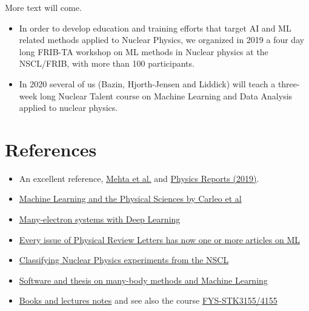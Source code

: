 \documentclass[%
oneside,                 %
final,                   %
10pt]{article}
\begin{document}
More text will come.

\begin{itemize}
\item In order to develop education and training efforts that target AI and ML related methods applied to Nuclear Physics, we  organized in 2019 a four day long  FRIB-TA workshop on ML methods in Nuclear physics at the NSCL/FRIB, with more than 100 participants.

\item In 2020 several of us (Bazin, Hjorth-Jensen and Liddick) will teach a three-week long Nuclear Talent course on Machine Learning and Data Analysis applied to nuclear physics. 
\end{itemize}


\section{References}


\begin{itemize}
\item An excellent reference, \href{{https://arxiv.org/abs/1803.08823}}{Mehta et al.} and \href{{https://www.sciencedirect.com/science/article/pii/S0370157319300766?via%3Dihub}}{Physics Reports (2019)}.

\item \href{{https://arxiv.org/abs/1903.10563}}{Machine Learning and the Physical Sciences by Carleo et al}

\item \href{{https://arxiv.org/pdf/1909.02487.pdf}}{Many-electron systems with Deep Learning}

\item \href{{https://journals.aps.org/prl/abstract/10.1103/PhysRevLett.120.156001}}{Every issue of Physical Review Letters has now one or more articles on ML}

\item \href{{https://github.com/copperwire/thesis/blob/master/main.pdf}}{Classifying Nuclear Physics  experiments from the NSCL}

\item \href{{https://github.com/bsamseth/qflow}}{Software and thesis on many-body methods and Machine Learning}

\item \href{{https://github.com/CompPhysics/MachineLearning}}{Books and lectures notes} and see also the course \href{{https://www.uio.no/studier/emner/matnat/fys/FYS-STK4155/h18/index.html}}{FYS-STK3155/4155}
\end{itemize}
\end{document}
